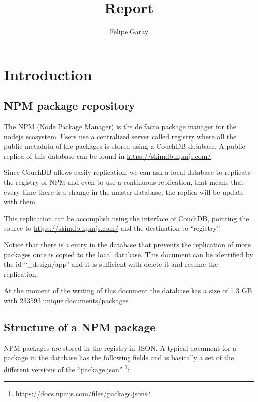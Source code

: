 \documentclass[letterpaper,12pt]{report}
\title{Report}
\author{Felipe Garay}
\begin{document}
\maketitle
\newpage
\tableofcontents
\newpage


\chapter{Introduction}

\section{NPM package repository}


The NPM (Node Package Manager) is the de facto package manager for the nodejs
ecosystem. Users use a centralized server called registry where all the public
metadata of the packages is stored using a CouchDB database. A public replica of this
database can be found in \url{https://skimdb.npmjs.com/}.

Since CouchDB allows easily replication, we can ask a local database to replicate
the registry of NPM and even to use a continuous replication, that means that
every time there is a change in the master database, the replica will be update
with them.

This replication can be accomplish using the interface of CouchDB, pointing the
source to \url{https://skimdb.npmjs.com/} and the destination to ``registry''.

Notice that there is a entry in the database that prevents the replication of
more packages once is copied to the local database. This document can be
identified by the id ``\_design/app'' and it is sufficient with delete it and
resume the replication.

At the moment of the writing of this document the database has a size of 1.3 GB
with 233593	unique documents/packages.

\section{Structure of a NPM package}


NPM packages are stored in the registry in JSON. A typical document for a
package in the database has the following fields and is basically a set of the
different versions of the ``package.json''
\footnote{https://docs.npmjs.com/files/package.json}:
\end{document}
